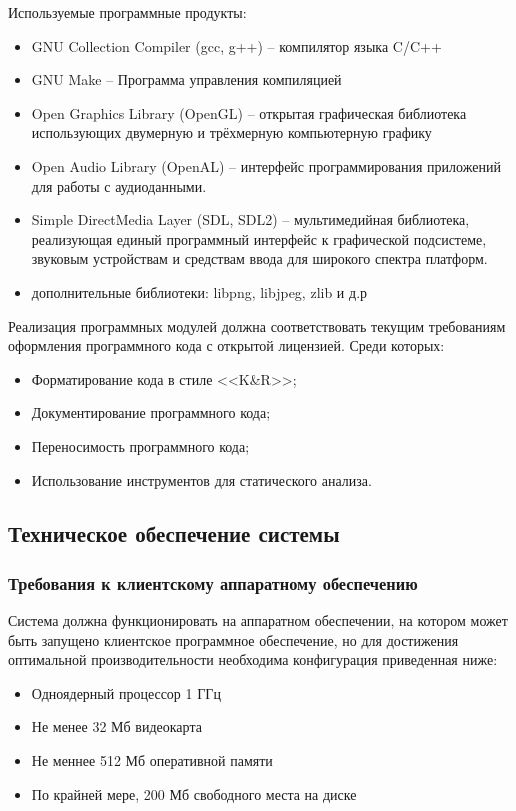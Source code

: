 Используемые программные продукты:
\begin{itemize}
    \item GNU Collection Compiler (gcc, g++) -- компилятор языка C/C++
    \item GNU Make -- Программа управления компиляцией
    \item Open Graphics Library (OpenGL) -- открытая графическая библиотека использующих двумерную 
        и трёхмерную компьютерную графику
    \item Open Audio Library (OpenAL) -- интерфейс программирования приложений для работы с аудиоданными.
    \item Simple DirectMedia Layer (SDL, SDL2) -- мультимедийная библиотека, реализующая единый 
        программный интерфейс к графической подсистеме, звуковым устройствам и средствам ввода 
        для широкого спектра платформ.
    \item дополнительные библиотеки: libpng, libjpeg, zlib и д.р
\end{itemize}

Реализация программных модулей должна соответствовать текущим требованиям оформления 
программного кода с открытой лицензией. Среди которых:
\begin{itemize}
    \item Форматирование кода в стиле <<K\&R>>;
    \item Документирование программного кода;
    \item Переносимость программного кода;
    \item Использование инструментов для статического анализа.
\end{itemize}

\subsection{Техническое обеспечение системы}
\subsubsection{Требования к клиентскому аппаратному обеспечению}
Система должна функционировать на аппаратном обеспечении, на котором может быть запущено 
клиентское программное обеспечение, но для достижения оптимальной производительности 
необходима конфигурация приведенная ниже:
\begin{itemize}
    \item Одноядерный процессор 1 ГГц
    \item Не менее 32 Мб видеокарта
    \item Не меннее 512 Мб оперативной памяти
    \item По крайней мере, 200 Мб свободного места на диске
\end{itemize}

